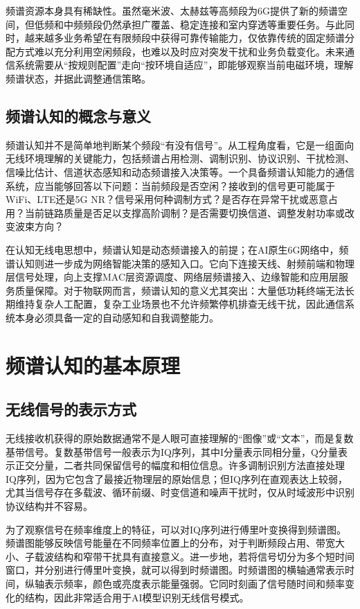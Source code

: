 \documentclass[UTF8,fontset=windows,zihao=-4]{ctexart}
\begin{document}
频谱资源本身具有稀缺性。虽然毫米波、太赫兹等高频段为6G提供了新的频谱空间，但低频和中频频段仍然承担广覆盖、稳定连接和室内穿透等重要任务。与此同时，越来越多业务希望在有限频段中获得可靠传输能力，仅依靠传统的固定频谱分配方式难以充分利用空闲频段，也难以及时应对突发干扰和业务负载变化。未来通信系统需要从“按规则配置”走向“按环境自适应”，即能够观察当前电磁环境，理解频谱状态，并据此调整通信策略。

\subsection{频谱认知的概念与意义}
频谱认知并不是简单地判断某个频段“有没有信号”。从工程角度看，它是一组面向无线环境理解的关键能力，包括频谱占用检测、调制识别、协议识别、干扰检测、信噪比估计、信道状态感知和动态频谱接入决策等。一个具备频谱认知能力的通信系统，应当能够回答以下问题：当前频段是否空闲？接收到的信号更可能属于WiFi、LTE还是5G NR？信号采用何种调制方式？是否存在异常干扰或恶意占用？当前链路质量是否足以支撑高阶调制？是否需要切换信道、调整发射功率或改变波束方向？

在认知无线电思想中，频谱认知是动态频谱接入的前提\cite{mitola,haykin}；在AI原生6G网络中，频谱认知则进一步成为网络智能决策的感知入口。它向下连接天线、射频前端和物理层信号处理，向上支撑MAC层资源调度、网络层频谱接入、边缘智能和应用层服务质量保障。对于物联网而言，频谱认知的意义尤其突出：大量低功耗终端无法长期维持复杂人工配置，复杂工业场景也不允许频繁停机排查无线干扰，因此通信系统本身必须具备一定的自动感知和自我调整能力。



\clearpage
\section{频谱认知的基本原理}
\subsection{无线信号的表示方式}
无线接收机获得的原始数据通常不是人眼可直接理解的“图像”或“文本”，而是复数基带信号。复数基带信号一般表示为IQ序列，其中I分量表示同相分量，Q分量表示正交分量，二者共同保留信号的幅度和相位信息。许多调制识别方法直接处理IQ序列，因为它包含了最接近物理层的原始信息；但IQ序列在直观表达上较弱，尤其当信号存在多载波、循环前缀、时变信道和噪声干扰时，仅从时域波形中识别协议结构并不容易。

为了观察信号在频率维度上的特征，可以对IQ序列进行傅里叶变换得到频谱图。频谱图能够反映信号能量在不同频率位置上的分布，对于判断频段占用、带宽大小、子载波结构和窄带干扰具有直接意义。进一步地，若将信号切分为多个短时间窗口，并分别进行傅里叶变换，就可以得到时频谱图。时频谱图的横轴通常表示时间，纵轴表示频率，颜色或亮度表示能量强弱。它同时刻画了信号随时间和频率变化的结构，因此非常适合用于AI模型识别无线信号模式。
\end{document}
